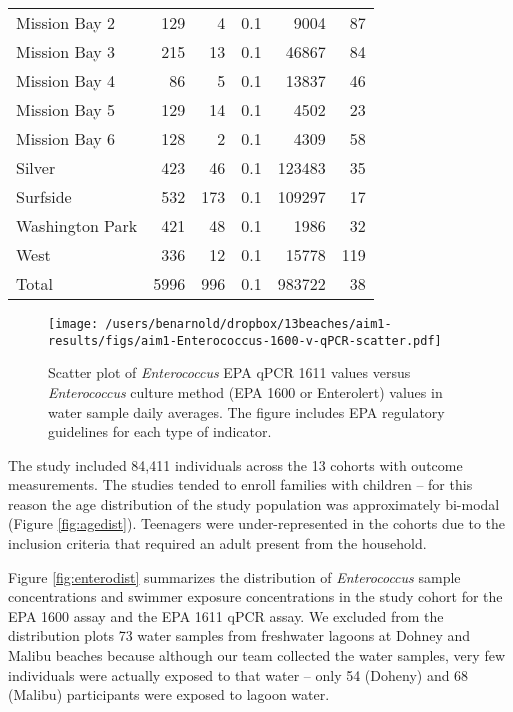 \documentclass[12pt]{article}\usepackage[]{graphicx}\usepackage[]{color}
\begin{document}
\begin{table}[h!tb]
\begin{center}
\begin{tabular}{l rrrrr}
  Mission Bay 2 & 129 & 4 & 0.1 & 9004 & 87 \\ 
  Mission Bay 3 & 215 & 13 & 0.1 & 46867 & 84 \\ 
  Mission Bay 4 & 86 & 5 & 0.1 & 13837 & 46 \\ 
  Mission Bay 5 & 129 & 14 & 0.1 & 4502 & 23 \\ 
  Mission Bay 6 & 128 & 2 & 0.1 & 4309 & 58 \\ 
  Silver & 423 & 46 & 0.1 & 123483 & 35 \\ 
  Surfside & 532 & 173 & 0.1 & 109297 & 17 \\ 
  Washington Park & 421 & 48 & 0.1 & 1986 & 32 \\ 
  West & 336 & 12 & 0.1 & 15778 & 119 \\ 
  
\hline
 Total & 5996 & 996 & 0.1 & 983722 & 38 \\ 
  
\hline
\end{tabular}
\end{center}
\end{table}



\clearpage
\begin{figure}
\begin{center}
\texttt{[image: /users/benarnold/dropbox/13beaches/aim1-results/figs/aim1-Enterococcus-1600-v-qPCR-scatter.pdf]}
\caption{Scatter plot of \emph{Enterococcus} EPA qPCR 1611 values versus \emph{Enterococcus} culture method (EPA 1600 or Enterolert) values in water sample daily averages. The figure includes EPA regulatory guidelines for each type of indicator.
 \label{fig:entero1600v1611}}
\end{center}
\end{figure}


\clearpage

The study included 84,411 individuals across the 13 cohorts with outcome measurements. The studies tended to enroll families with children  -- for this reason the age distribution of the study population was approximately bi-modal (Figure \ref{fig:agedist}). Teenagers were under-represented in the cohorts due to the inclusion criteria that required an adult present from the household. 

Figure \ref{fig:enterodist} summarizes the distribution of \emph{Enterococcus} sample concentrations and swimmer exposure concentrations in the study cohort for the EPA 1600 assay and the EPA 1611 qPCR assay. We excluded from the distribution plots 73 water samples from freshwater lagoons at Dohney and Malibu beaches because although our team collected the water samples, very few individuals were actually exposed to that water -- only 54 (Doheny) and 68 (Malibu) participants were exposed to lagoon water.
\end{document}
